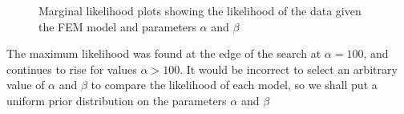 \documentclass{article}
\begin{document}
\begin{figure}[H]%
	\centering
	\qquad
	\qquad
	\caption{Marginal likelihood plots showing the likelihood of the data given the FEM model and parameters $\alpha$ and $\beta$}%
	\label{fig:example}%
\end{figure}
The maximum likelihood was found at the edge of the search at $\alpha = 100$, and continues to rise for values $\alpha > 100$. It would be incorrect to select an arbitrary value of $\alpha$ and $\beta$ to compare the likelihood of each model, so we shall put a uniform prior distribution on the parameters $\alpha$ and $\beta$
\end{document}
